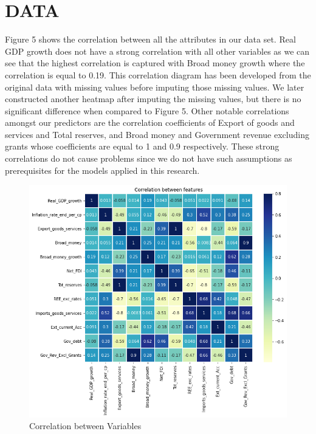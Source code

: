 \documentclass[12pt,italian, twoside]{report}
\begin{document}
\chapter{DATA}
Figure 5 shows the correlation between all the attributes in our data set. Real GDP growth does not have a strong correlation with all other variables as we can see that the highest correlation is captured with Broad money growth where the correlation is equal to 0.19. This correlation diagram has been developed from the original data with missing values before imputing those missing values. We later constructed another heatmap after imputing the missing values, but there is no significant difference when compared to Figure 5. Other notable correlations amongst our predictors are the correlation coefficients of Export of goods and services and Total reserves, and Broad money and Government revenue excluding grants whose coefficients are equal to 1 and 0.9 respectively. These strong correlations do not cause problems since we do not have such assumptions as prerequisites for the models applied in this research.\\
	\begin{figure}[t]
	\centering
	\includegraphics[width = 145mm]{immagini/corr.png}
	\caption{Correlation between Variables}
	\label{fig: corr}
\end{figure}
\end{document}
